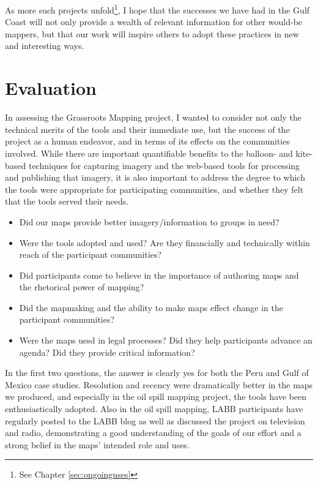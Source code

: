 \documentclass[11pt,oneside,notitlepage]{report}
\begin{document}
As more such projects unfold\footnote{See Chapter \ref{sec:ongoinguses}}, I hope that the successes we have had in the Gulf Coast will not only provide a wealth of relevant information for other would-be mappers, but that our work will inspire others to adopt these practices in new and interesting ways.  

\chapter{Evaluation}

In assessing the Grassroots Mapping project, I wanted to consider not only the technical merits of the tools and their immediate use, but the success of the project as a human endeavor, and in terms of its effects on the communities involved. While there are important quantifiable benefits to the balloon- and kite-based techniques for capturing imagery and the web-based tools for processing and publishing that imagery, it is also important to address the degree to which the tools were appropriate for participating communities, and whether they felt that the tools served their needs. 

\begin{itemize}
\item Did our maps provide better imagery/information to groups in need?
\item Were the tools adopted and used? Are they financially and technically within reach of the participant communities? 
\item Did participants come to believe in the importance of authoring maps and the rhetorical power of mapping?
\item Did the mapmaking and the ability to make maps effect change in the participant communities?
\item Were the maps uesd in legal processes? Did they help participants advance an agenda? Did they provide critical information?
\end{itemize}

In the first two questions, the answer is clearly yes for both the Peru and Gulf of Mexico case studies. Resolution and recency were dramatically better in the maps we produced, and especially in the oil spill mapping project, the tools have been enthusiastically adopted. Also in the oil spill mapping, \ac{LABB} participants have regularly posted to the \ac{LABB} blog as well as discussed the project on television and radio, demonstrating a good understanding of the goals of our effort and a strong belief in the maps' intended role and uses. 
\end{document}
